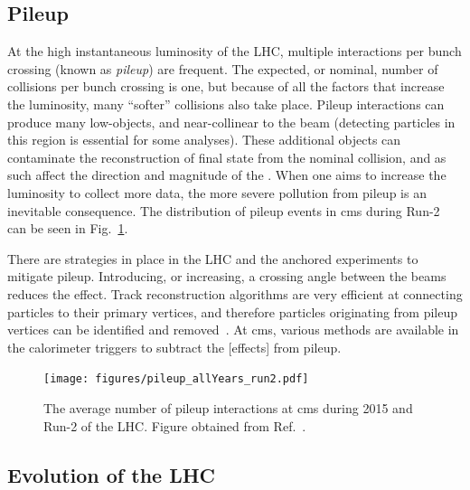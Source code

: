 

\subsection{Pileup}
\label{subsec:pileup}

At the high instantaneous luminosity of the LHC, multiple interactions per bunch crossing (known as \emph{\gls{pileup}}) are frequent. The expected, or nominal, number of collisions per bunch crossing is one, but because of all the factors that increase the luminosity, many ``softer'' collisions also take place. Pileup interactions can produce many low-\pt objects, and near-collinear to the beam (detecting particles in this region is essential for some analyses). These additional objects can contaminate the reconstruction of final state from the nominal collision, and as such affect the direction and magnitude of the \ptmiss. When one aims to increase the luminosity to collect more data, the more severe pollution from pileup is an inevitable consequence. The distribution of pileup events in \acrshort{cms} during Run-2 can be seen in Fig.~\ref{fig:detector_cms_pileup}.

There are strategies in place in the LHC and the anchored experiments to mitigate pileup. Introducing, or increasing, a crossing angle between the beams reduces the effect. Track reconstruction algorithms are very efficient at connecting particles to their primary vertices, and therefore particles originating from pileup vertices can be identified and removed~\cite{Chatrchyan:2014fea,Aaboud:2017all}. At \acrshort{cms}, various methods are available in the calorimeter triggers to subtract the [effects] from pileup.

\begin{figure}[htbp]
    \centering
    \texttt{[image: figures/pileup\_allYears\_run2.pdf]}
    \caption[The average number of pileup interactions at CMS during 2015 and Run-2 of the LHC]{The average number of pileup interactions at \acrshort{cms} during 2015 and Run-2 of the LHC. Figure obtained from Ref.~.}
    \label{fig:detector_cms_pileup}
\end{figure}




\subsection{Evolution of the LHC}
\label{subsec:evolution_lhc}

